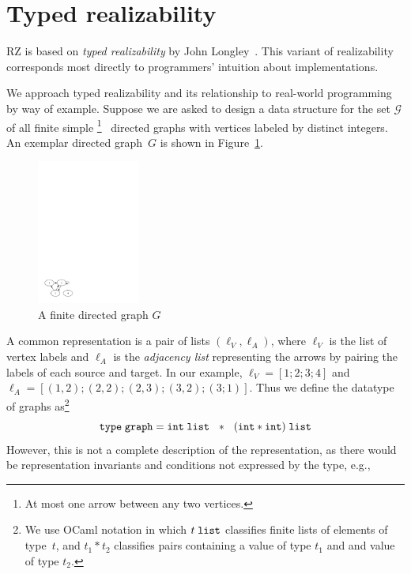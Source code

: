 \section{Typed realizability}
\label{sec:typed-realizability}

RZ is based on \emph{typed realizability} by John
Longley~\cite{Longley99}.   This variant of realizability corresponds most
directly to programmers' intuition about implementations.

We approach typed realizability and its relationship to
real-world programming by way of example. Suppose we are asked to
design a data structure for the set $\mathcal{G}$ of all finite
simple%
\iflong
\footnote{At most one arrow between any two vertices.}
\fi %
\ directed graphs with vertices labeled by distinct integers. 
%
\iflong
An exemplar
directed graph~$G$ is shown in Figure~\ref{fig:digraph}.
%
\begin{figure}
  \centering
  \includegraphics[width=0.3\textwidth]{digraph}
  \caption{A finite directed graph $G$}
  \label{fig:digraph}
\end{figure}
\fi %
%
A common representation is a pair of lists $(\ell_V, \ell_A)$, where
$\ell_V$ is the list of vertex labels and $\ell_A$ is the \emph{adjacency list} 
representing the arrows by pairing the labels of each source and target.
\iflong
In our example,
$\ell_V = [1; 2;
3; 4]$ and $\ell_A = [(1,2); (2,2); (2,3); (3,2); (3;1)]$.
\fi %
%
Thus we define the datatype of graphs as\footnote{We use OCaml
  notation in which $t\;\mathtt{list}$ classifies finite lists of elements of
  type~$t$, and $t_1 * t_2$ classifies pairs containing a value of
  type $t_1$ and and value of type $t_2$.}
%
\begin{equation*}
  \mathtt{type}\; \mathtt{graph} = \mathtt{int}\;\mathtt{list} \ \ * \ \ (\mathtt{int} * \mathtt{int})\;\mathtt{list}
\end{equation*}
%
However, this is not a complete description of the representation, as
there would be representation invariants and conditions not expressed by the type, e.g.,
